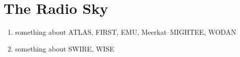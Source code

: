 \chapter{The Radio Sky}

\begin{enumerate}
    \item something about ATLAS, FIRST, EMU, Meerkat--MIGHTEE, WODAN
    \item something about SWIRE, WISE
\end{enumerate}
